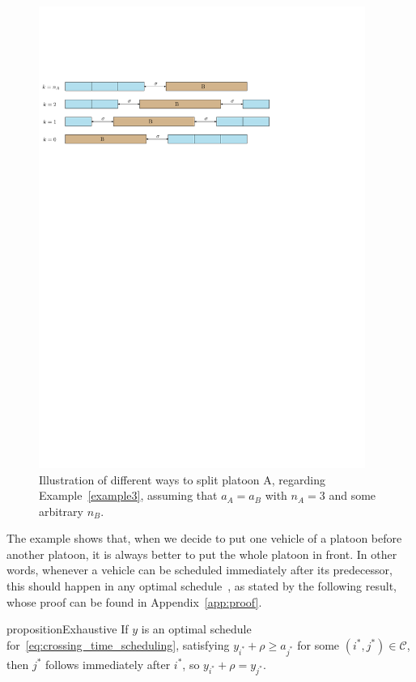 \documentclass[a4paper]{article}
\theoremstyle{definition}
\theoremstyle{plain}
\begin{document}
\begin{figure}
  \centering
  \includegraphics[width=0.95\textwidth]{figures/single/platoons.pdf}
  \caption{Illustration of different ways to split platoon A, regarding
    Example~\ref{example3}, assuming that $a_{A} = a_{B}$ with $n_{A} = 3$ and
    some arbitrary $n_{B}$.}
  \label{fig:example3}
\end{figure}

The example shows that, when we decide to put one vehicle of a platoon before
another platoon, it is always better to put the whole platoon in front. In other
words, whenever a vehicle can be scheduled immediately after its predecessor,
this should happen in any optimal schedule~\cite{limpensOnlinePlatoonForming2023}, as stated by the following
result, whose proof can be found in Appendix~\ref{app:proof}.

\begin{restatable}{proposition}{Exhaustive}\label{prop:exhaustive}
  If $y$ is an optimal schedule for~\eqref{eq:crossing_time_scheduling},
  satisfying $y_{i^{*}} + \rho \geq a_{j^{*}}$ for some $(i^{*},j^{*}) \in \mathcal{C}$, then $j^{*}$
  follows immediately after $i^{*}$, so $y_{i^{*}} + \rho = y_{j^{*}}$.
\end{restatable}
\end{document}
